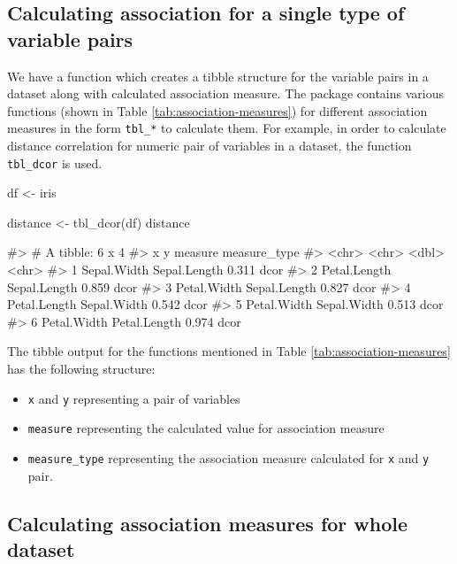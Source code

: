 \hypertarget{calculating-association-for-a-single-type-of-variable-pairs}{%
\subsection{Calculating association for a single type of variable
pairs}\label{calculating-association-for-a-single-type-of-variable-pairs}}

We have a function which creates a tibble structure for the variable
pairs in a dataset along with calculated association measure. The
package contains various functions (shown in Table
\ref{tab:association-measures}) for different association measures in
the form \texttt{tbl\_*} to calculate them. For example, in order to
calculate distance correlation for numeric pair of variables in a
dataset, the function \texttt{tbl\_dcor} is used.

\begin{Schunk}
\begin{Sinput}
df <- iris


distance <- tbl_dcor(df)
distance
\end{Sinput}
\begin{Soutput}
#> # A tibble: 6 x 4
#>   x            y            measure measure_type
#>   <chr>        <chr>          <dbl> <chr>       
#> 1 Sepal.Width  Sepal.Length   0.311 dcor        
#> 2 Petal.Length Sepal.Length   0.859 dcor        
#> 3 Petal.Width  Sepal.Length   0.827 dcor        
#> 4 Petal.Length Sepal.Width    0.542 dcor        
#> 5 Petal.Width  Sepal.Width    0.513 dcor        
#> 6 Petal.Width  Petal.Length   0.974 dcor
\end{Soutput}
\end{Schunk}

The tibble output for the functions mentioned in Table
\ref{tab:association-measures} has the following structure:

\begin{itemize}
\tightlist
\item
  \texttt{x} and \texttt{y} representing a pair of variables
\item
  \texttt{measure} representing the calculated value for association
  measure
\item
  \texttt{measure\_type} representing the association measure calculated
  for \texttt{x} and \texttt{y} pair.
\end{itemize}

\hypertarget{calculating-association-measures-for-whole-dataset}{%
\subsection{Calculating association measures for whole
dataset}\label{calculating-association-measures-for-whole-dataset}}

